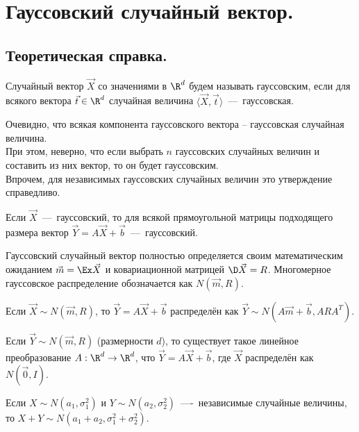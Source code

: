 \section{Гауссовский случайный вектор.}
\subsection{Теоретическая справка.}
\begin{definition}
    Случайный вектор $\vec{X}$ со значениями в $\R^d$ будем называть гауссовским, если для всякого вектора $\vec{t} \in \R^d$ случайная величина $\langle \vec{X}, \vec{t} \rangle$~---~гауссовская.
\end{definition}
\begin{note}
    Очевидно, что всякая компонента гауссовского вектора -- гауссовская случайная величина. \\
    При этом, неверно, что если выбрать $n$ гауссовских случайных величин и составить из них вектор, то он будет гауссовским. \\
    Впрочем, для независимых гауссовских случайных величин это утверждение справедливо.
\end{note}
\begin{proposition}
    Если $\vec{X}$~---~гауссовский, то для всякой прямоугольной матрицы подходящего размера вектор $\vec{Y} = A\vec{X} + \vec{b}$~---~гауссовский.
\end{proposition}
\begin{proposition}
    Гауссовский случайный вектор полностью определяется своим математическим ожиданием $\vec{m} = \Ex \vec{X}$ и ковариационной матрицей $\D \vec{X} = R$.
    Многомерное гауссовское распределение обозначается как $N(\vec{m}, R)$.
\end{proposition}
\begin{proposition}
    Если $\vec{X} \sim N(\vec{m}, R)$, то $\vec{Y} = A\vec{X} + \vec{b}$ распределён как $\vec{Y} \sim N(A\vec{m} + \vec{b}, ARA^T)$.
\end{proposition}
\begin{proposition}
    Если $\vec{Y} \sim N(\vec{m}, R)$ (размерности $d$), то существует такое линейное преобразование $A: \R^d \to \R^d$, что $\vec{Y} = A\vec{X} + \vec{b}$, где $\vec{X}$ распределён как $N(\vec{0}, I)$.
\end{proposition}
\begin{lemma}
    Если $X \sim N(a_1, \sigma_1^2)$ и $Y \sim N(a_2, \sigma_2^2)$~----~независимые случайные величины, то $X + Y \sim N(a_1 + a_2, \sigma_1^2 + \sigma_2^2)$.
\end{lemma}
